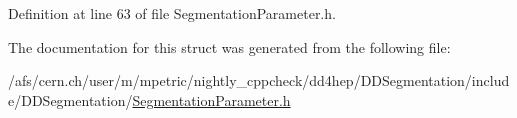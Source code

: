 Definition at line 63 of file SegmentationParameter.h.

The documentation for this struct was generated from the following file:\begin{DoxyCompactItemize}
\item 
/afs/cern.ch/user/m/mpetric/nightly\_\-cppcheck/dd4hep/DDSegmentation/include/DDSegmentation/\hyperlink{_segmentation_parameter_8h}{SegmentationParameter.h}\end{DoxyCompactItemize}

